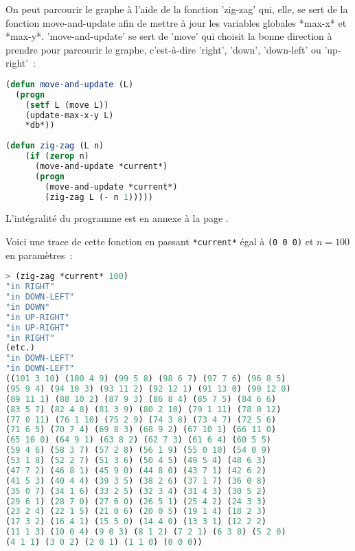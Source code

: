 \documentclass{article}
\begin{document}
On peut parcourir le graphe à l'aide de la fonction 'zig-zag' qui, elle, se sert de la fonction move-and-update afin de mettre à jour les variables globales *max-x* et *max-y*. 'move-and-update' se sert de 'move' qui choisit la bonne direction à prendre pour parcourir le graphe, c'est-à-dire 'right', 'down', 'down-left' ou 'up-right'~:

\begin{lstlisting}[language=Lisp]
(defun move-and-update (L)
  (progn
    (setf L (move L))
    (update-max-x-y L)
    *db*))
 
(defun zig-zag (L n)
    (if (zerop n) 
      (move-and-update *current*)
      (progn
        (move-and-update *current*)
        (zig-zag L (- n 1)))))
\end{lstlisting}



L'intégralité du programme est en annexe à la page \pageref{couples.lisp}.

Voici une trace de cette fonction en passant \lstinline!*current*! égal à \lstinline!(0 0 0)! et $n = 100$ en paramètres~:

\begin{lstlisting}[language=Lisp]
> (zig-zag *current* 100)
"in RIGHT" 
"in DOWN-LEFT" 
"in DOWN" 
"in UP-RIGHT" 
"in UP-RIGHT" 
"in RIGHT" 
(etc.)
"in DOWN-LEFT" 
"in DOWN-LEFT" 
((101 3 10) (100 4 9) (99 5 8) (98 6 7) (97 7 6) (96 8 5) 
(95 9 4) (94 10 3) (93 11 2) (92 12 1) (91 13 0) (90 12 0) 
(89 11 1) (88 10 2) (87 9 3) (86 8 4) (85 7 5) (84 6 6) 
(83 5 7) (82 4 8) (81 3 9) (80 2 10) (79 1 11) (78 0 12) 
(77 0 11) (76 1 10) (75 2 9) (74 3 8) (73 4 7) (72 5 6) 
(71 6 5) (70 7 4) (69 8 3) (68 9 2) (67 10 1) (66 11 0) 
(65 10 0) (64 9 1) (63 8 2) (62 7 3) (61 6 4) (60 5 5) 
(59 4 6) (58 3 7) (57 2 8) (56 1 9) (55 0 10) (54 0 9) 
(53 1 8) (52 2 7) (51 3 6) (50 4 5) (49 5 4) (48 6 3) 
(47 7 2) (46 8 1) (45 9 0) (44 8 0) (43 7 1) (42 6 2) 
(41 5 3) (40 4 4) (39 3 5) (38 2 6) (37 1 7) (36 0 8) 
(35 0 7) (34 1 6) (33 2 5) (32 3 4) (31 4 3) (30 5 2) 
(29 6 1) (28 7 0) (27 6 0) (26 5 1) (25 4 2) (24 3 3) 
(23 2 4) (22 1 5) (21 0 6) (20 0 5) (19 1 4) (18 2 3) 
(17 3 2) (16 4 1) (15 5 0) (14 4 0) (13 3 1) (12 2 2) 
(11 1 3) (10 0 4) (9 0 3) (8 1 2) (7 2 1) (6 3 0) (5 2 0) 
(4 1 1) (3 0 2) (2 0 1) (1 1 0) (0 0 0))
\end{lstlisting}
\end{document}
